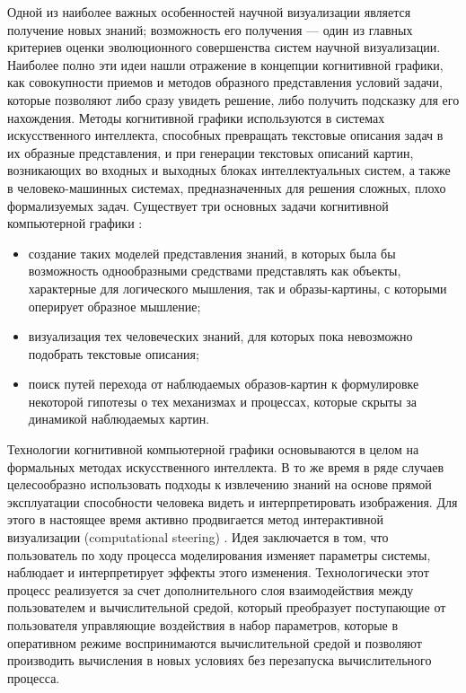 Одной из наиболее важных особенностей научной визуализации является получение новых знаний; возможность его получения --– один из главных критериев оценки эволюционного совершенства систем научной визуализации. Наиболее полно эти идеи нашли отражение в концепции когнитивной графики, как совокупности приемов и методов образного представления условий задачи, которые позволяют либо сразу увидеть решение, либо получить подсказку для его нахождения. Методы когнитивной графики используются в системах искусственного интеллекта, способных превращать текстовые описания задач в их образные представления, и при генерации текстовых описаний картин, возникающих во входных и выходных блоках интеллектуальных систем, а также в человеко-машинных системах, предназначенных для решения сложных, плохо формализуемых задач. Существует три основных задачи когнитивной компьютерной графики \citep{dk65}:

\begin{itemize}
	\item	создание таких моделей представления знаний, в которых была бы 
			возможность однообразными средствами представлять как объекты, 
			характерные для логического мышления, так и образы-картины, с 
			которыми оперирует образное мышление;
	\item	визуализация тех человеческих знаний, для которых пока 
			невозможно подобрать текстовые описания;
	\item	поиск путей перехода от наблюдаемых образов-картин 
			к формулировке некоторой гипотезы о тех механизмах 
			и процессах, которые скрыты за динамикой наблюдаемых картин.
\end{itemize}

Технологии когнитивной компьютерной графики основываются в целом на формальных методах искусственного интеллекта. В то же время в ряде случаев целесообразно использовать подходы к извлечению знаний на основе прямой эксплуатации способности человека видеть и интерпретировать изображения. Для этого в настоящее время активно продвигается метод интерактивной визуализации (computational steering) \citep{dk66}\citep{dk67}. Идея заключается в том, что пользователь по ходу процесса моделирования изменяет параметры системы, наблюдает и интерпретирует эффекты этого изменения. Технологически этот процесс реализуется за счет дополнительного слоя взаимодействия между пользователем и вычислительной средой, который преобразует поступающие от пользователя управляющие воздействия в набор параметров, которые в оперативном режиме воспринимаются вычислительной средой и позволяют производить вычисления в новых условиях без перезапуска вычислительного процесса.

